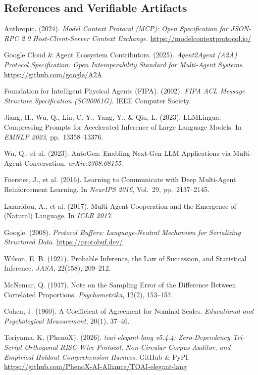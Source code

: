 \documentclass[9pt,a4paper]{extarticle}
\begin{document}
\subsection*{References and Verifiable Artifacts}
\begin{enumerate}[label={[\arabic*]},leftmargin=1.8em,itemsep=0.4pt,topsep=0.8pt]
  \item{\footnotesize Anthropic. (2024). \emph{Model Context Protocol (MCP): Open Specification for JSON-RPC 2.0 Host-Client-Server Context Exchange}. \url{https://modelcontextprotocol.io/}}
  \item{\footnotesize Google Cloud \& Agent Ecosystem Contributors. (2025). \emph{Agent2Agent (A2A) Protocol Specification: Open Interoperability Standard for Multi-Agent Systems}. \url{https://github.com/google/A2A}}
  \item{\footnotesize Foundation for Intelligent Physical Agents (FIPA). (2002). \emph{FIPA ACL Message Structure Specification (SC00061G)}. IEEE Computer Society.}
  \item{\footnotesize Jiang, H., Wu, Q., Lin, C.-Y., Yang, Y., \& Qiu, L. (2023). LLMLingua: Compressing Prompts for Accelerated Inference of Large Language Models. In \emph{EMNLP 2023}, pp.\ 13358--13376.}
  \item{\footnotesize Wu, Q., et al. (2023). AutoGen: Enabling Next-Gen LLM Applications via Multi-Agent Conversation. \emph{arXiv:2308.08155}.}
  \item{\footnotesize Foerster, J., et al. (2016). Learning to Communicate with Deep Multi-Agent Reinforcement Learning. In \emph{NeurIPS 2016}, Vol.\ 29, pp.\ 2137--2145.}
  \item{\footnotesize Lazaridou, A., et al. (2017). Multi-Agent Cooperation and the Emergence of (Natural) Language. In \emph{ICLR 2017}.}
  \item{\footnotesize Google. (2008). \emph{Protocol Buffers: Language-Neutral Mechanism for Serializing Structured Data}. \url{https://protobuf.dev/}}
  \item{\footnotesize Wilson, E. B. (1927). Probable Inference, the Law of Succession, and Statistical Inference. \emph{JASA}, 22(158), 209--212.}
  \item{\footnotesize McNemar, Q. (1947). Note on the Sampling Error of the Difference Between Correlated Proportions. \emph{Psychometrika}, 12(2), 153--157.}
  \item{\footnotesize Cohen, J. (1960). A Coefficient of Agreement for Nominal Scales. \emph{Educational and Psychological Measurement}, 20(1), 37--46.}
  \item{\footnotesize Toriyama, K. (PhenoX). (2026). \emph{toai-elegant-lang v5.4.4: Zero-Dependency Tri-Script Orthogonal RISC Wire Protocol, Non-Circular Corpus Auditor, and Empirical Holdout Comprehension Harness}. GitHub \& PyPI. \url{https://github.com/PhenoX-AI-Alliance/TOAI-elegant-lang}}
\end{enumerate}
\end{document}
